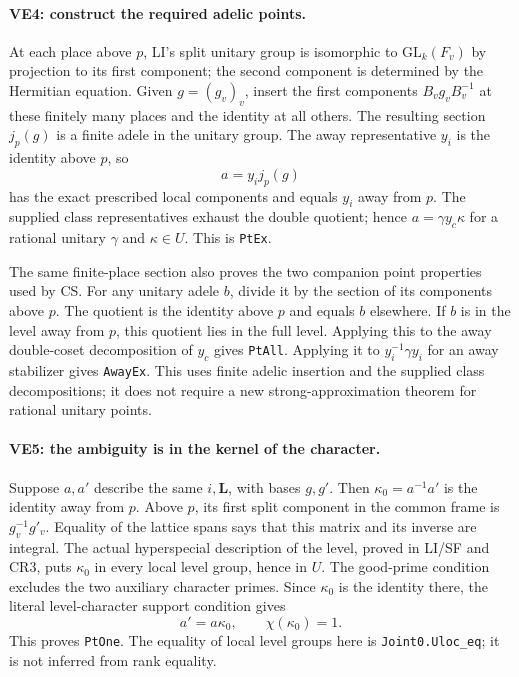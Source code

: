 \paragraph{VE4: construct the required adelic points.}
At each place above $p$, LI's split unitary group is isomorphic to
$\mathrm{GL}_k(F_v)$ by projection to its first component; the
second component is determined by the Hermitian equation. Given
$g=(g_v)_v$, insert the first components $B_vg_vB_v^{-1}$ at these
finitely many places and the identity at all others. The resulting
section $j_p(g)$ is a finite adele in the unitary group.
The away representative $y_i$ is the identity above $p$, so
\[
 a=y_i j_p(g)
                                                        \tag{VE.9}
\]
has the exact prescribed local components and equals $y_i$ away
from $p$. The supplied class representatives exhaust the double
quotient; hence $a=\gamma y_c\kappa$ for a rational unitary
$\gamma$ and $\kappa\in U$. This is \texttt{PtEx}.

The same finite-place section also proves the two companion point
properties used by CS. For any unitary adele $b$, divide it by the
section of its components above $p$. The quotient is the identity
above $p$ and equals $b$ elsewhere. If $b$ is in the level away
from $p$, this quotient lies in the full level. Applying this to
the away double-coset decomposition of $y_c$ gives \texttt{PtAll}.
Applying it to $y_i^{-1}\gamma y_i$ for an away stabilizer gives
\texttt{AwayEx}. This uses finite adelic insertion and the supplied
class decompositions; it does not require a new strong-approximation
theorem for rational unitary points.

\paragraph{VE5: the ambiguity is in the kernel of the character.}
Suppose $a,a'$ describe the same $i,\mathbf L$, with bases $g,g'$.
Then $\kappa_0=a^{-1}a'$ is the identity away from $p$. Above $p$,
its first split component in the common frame is $g_v^{-1}g'_v$.
Equality of the lattice spans says that this matrix and its inverse
are integral. The actual hyperspecial description of the level,
proved in LI/SF and CR3, puts $\kappa_0$ in every local level group,
hence in $U$. The good-prime condition excludes the two auxiliary
character primes. Since $\kappa_0$ is the identity there, the
literal level-character support condition gives
\[
 a'=a\kappa_0,\qquad \chi(\kappa_0)=1.
                                                        \tag{VE.10}
\]
This proves \texttt{PtOne}. The equality of local level groups here
is \texttt{Joint0.Uloc\_eq}; it is not inferred from rank equality.

